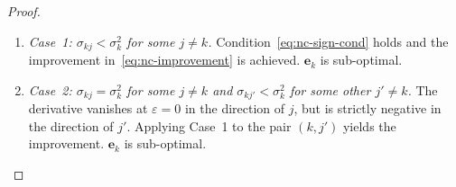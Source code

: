 \documentclass[12pt,openany]{book}
\newcommand{\bfe}{\mathbf{e}}
\numberwithin{equation}{chapter}
\theoremstyle{plain}
\theoremstyle{definition}
\theoremstyle{remark}
\begin{document}
\begin{proof}
\begin{enumerate}
        \begin{enumerate}

          \item \emph{Case~1: $\sigma_{kj} < \sigma_k^2$ for some
                $j \neq k$.}
                Condition~\eqref{eq:nc-sign-cond} holds and the
                improvement in~\eqref{eq:nc-improvement} is achieved.
                $\bfe_k$ is sub-optimal.

          \item \emph{Case~2: $\sigma_{kj} = \sigma_k^2$ for some
                $j \neq k$ and $\sigma_{kj'} < \sigma_k^2$ for some
                other $j' \neq k$.}
                The derivative vanishes at $\varepsilon=0$ in the
                direction of $j$, but is strictly negative in the
                direction of $j'$.  Applying Case~1 to the pair
                $(k, j')$ yields the improvement.
                $\bfe_k$ is sub-optimal.


\end{enumerate}
\end{enumerate}
\end{proof}
\end{document}
